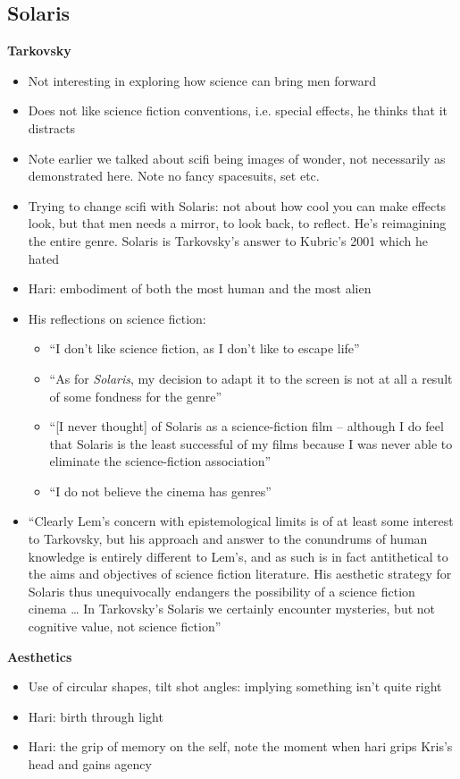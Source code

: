 \documentclass[11pt,fleqn]{book} %
\begin{document}
\subsection{Solaris}
\textbf{Tarkovsky}
\begin{itemize}
    \item Not interesting in exploring how science can bring men forward
    \item Does not like science fiction conventions, i.e. special effects, he thinks that it distracts
    \item Note earlier we talked about scifi being images of wonder, not necessarily as demonstrated here. Note no fancy spacesuits, set etc.
    \item Trying to change scifi with Solaris: not about how cool you can make effects look, but that men needs a mirror, to look back, to reflect. He's reimagining the entire genre. Solaris is Tarkovsky's answer to Kubric's 2001 which he hated
    \item Hari: embodiment of both the most human and the most alien
    \item His reflections on science fiction:
    \begin{itemize}
        \item \enquote{I don't like science fiction, as I don't like to escape life}
        \item \enquote{As for \textit{Solaris}, my decision to adapt it to the screen is not at all a result of
some fondness for the genre}
        \item \enquote{[I never thought] of Solaris as a science-fiction film – although I do feel that
Solaris is the least successful of my films because I was never able to
eliminate the science-fiction association}
        \item \enquote{I do not believe the cinema has genres}
    \end{itemize}
    \item \enquote{Clearly Lem's concern with epistemological limits is of at least some
interest to Tarkovsky, but his approach and answer to the conundrums
of human knowledge is entirely different to Lem's, and as such is in fact
antithetical to the aims and objectives of science fiction literature. His
aesthetic strategy for Solaris thus unequivocally endangers the
possibility of a science fiction cinema … In Tarkovsky's Solaris we
certainly encounter mysteries, but not cognitive value, not science
fiction}
\end{itemize}
\textbf{Aesthetics}
\begin{itemize}
    \item Use of circular shapes, tilt shot angles: implying something isn't quite right
    \item Hari: birth through light
    \item Hari: the grip of memory on the self, note the moment when hari grips Kris's head and gains agency
\end{itemize}
\end{document}

